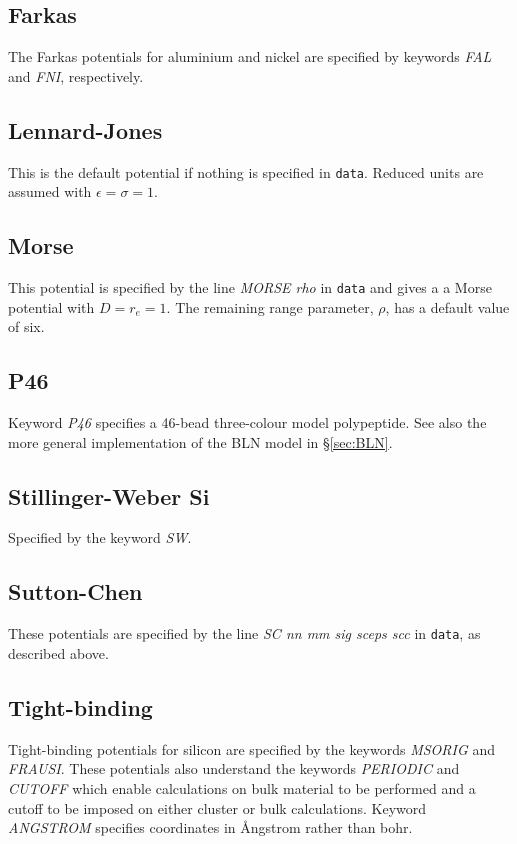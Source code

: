 \documentclass[12pt,a4paper,dvips]{article}
\begin{document}
\subsection{Farkas}

The Farkas potentials for aluminium and nickel are specified by keywords {\it FAL\/} and
{\it FNI\/}, respectively.

\subsection{Lennard-Jones}

This is the default potential if nothing is specified in {\tt data}. Reduced units are
assumed with $\epsilon=\sigma=1$.

\subsection{Morse}

This potential is specified by the line {\it MORSE rho\/} in {\tt data} and gives a
a Morse potential with $D=r_e=1$. 
The remaining range parameter,\cite{braierbw90,doyewb95,doyew96a} $\rho$, has a default 
value of six.

\subsection{P46}

Keyword {\it P46\/} specifies a 46-bead three-colour model polypeptide. 
See also the more general implementation of the BLN model in \S \ref{sec:BLN}.

\subsection{Stillinger-Weber Si}

Specified by the keyword {\it SW\/}.

\subsection{Sutton-Chen}

These potentials\cite{suttonc90} are specified by the line {\it SC nn mm sig sceps scc\/} in {\tt data},
as described above. 

\subsection{Tight-binding}

Tight-binding potentials for silicon are specified by the keywords {\it MSORIG\/} 
and {\it FRAUSI\/}.
These potentials also understand the 
keywords {\it PERIODIC\/} and {\it CUTOFF\/} which enable calculations on bulk material
to be performed and a cutoff to be imposed on either cluster or bulk calculations.
Keyword {\it ANGSTROM\/} specifies coordinates in \AA ngstrom rather than bohr.
\end{document}
